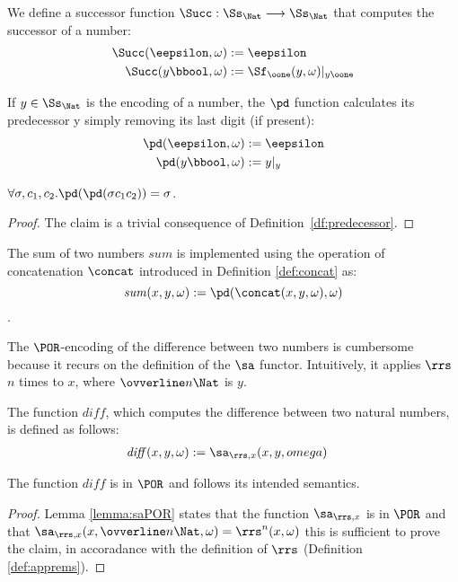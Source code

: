 \begin{conditional}{\notappendix}
  \begin{defn}[Successor]
  We define a successor function
  $\Succ : \Ss_\Nat \longrightarrow \Ss_\Nat$
  that computes the successor of a number:
  \begin{align*}
  \Succ(\eepsilon, \omega) &:= \eepsilon \\
  \Succ(y\bbool, \omega) &:= \Sf_\oone(y,\omega)|_{y\oone}
  \end{align*}
  \end{defn}
  \noindent


  \begin{defn}[Predecessor]\label{df:predecessor}
  If $y\in \Ss_\Nat$ is the encoding
  of a number,
  the $\pd$ function calculates
  its predecessor y simply removing its
  last digit (if present):
  \begin{align*}
  \pd(\eepsilon,\omega) &:= \eepsilon \\
  \pd(y\bbool,\omega) &:= y|_y
  \end{align*}
  \end{defn}

  \begin{remark}
  $\forall \sigma,c_1,c_2.\pd(\pd(\sigma c_1c_2))=\sigma$.
\end{remark}
  \begin{proof}
  The claim is a trivial consequence of Definition~\ref{df:predecessor}.
  \end{proof}


  \begin{defn}[Sum]
  The sum of two numbers $\mathit{sum}$
  is implemented using the operation of concatenation
  $\concat$ introduced in Definition \ref{def:concat} as:
  \[
  \mathit{sum}(x, y, \omega) := \pd(\concat(x, y, \omega), \omega)
  \].
  \end{defn}


  The $\POR$-encoding of the difference
  between two numbers is cumbersome
  because it recurs on the definition of
  the $\sa$ functor.
  Intuitively, it applies $\rrs$ $n$ times to $x$,
  where $\ovverline n\Nat$ is $y$.

  \begin{defn}[Difference]
  The function $\mathit{diff}$, which computes
  the difference between two natural numbers,
  is defined as follows:
  \begin{align*}
  \mathit{diff}(x, y, \omega) &:= \sa_{\rrs, x}(x, y, omega)
  \end{align*}
  \end{defn}
  \begin{remark}
    The function $\mathit{diff}$ is in $\POR$ and follows its intended semantics.
  \end{remark}
  \begin{proof}
      Lemma \ref{lemma:saPOR} states that the function $\sa_{\rrs, x}$ is in
      $\POR$ and that $\sa_{\rrs, x}(x, \ovverline n \Nat, \omega)=\rrs^n(x, \omega)$
      this is sufficient to prove the claim, in accoradance with the definition
      of $\rrs$ (Definition \ref{def:apprems}).
  \end{proof}


\end{conditional}
